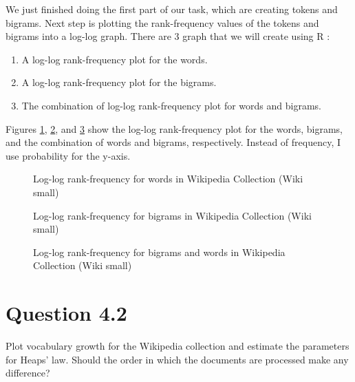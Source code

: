 \documentclass[letterpaper,11pt]{article}
\begin{document}
We just finished doing the first part of our task, which are creating tokens and bigrams. Next step is plotting the rank-frequency values of the tokens and bigrams into a log-log graph. There are 3 graph that we will create using R \cite{r-project}:
\begin{enumerate}
\item A log-log rank-frequency plot for the words.
\item A log-log rank-frequency plot for the bigrams.
\item The combination of log-log rank-frequency plot for words and bigrams. 
\end{enumerate}

Figures \ref{fig:4_1_rank_freq_plot}, \ref{fig:4_1_rank_freq_bigram_plot}, and \ref{fig:4_1_log_log_plot_combination} show the log-log rank-frequency plot for the words, bigrams, and the combination of words and bigrams, respectively. Instead of frequency, I use probability for the y-axis. 

\begin{figure}[H]
	\centering
	\caption{Log-log rank-frequency for words in Wikipedia Collection (Wiki small)}
	\label{fig:4_1_rank_freq_plot}
\end{figure}

\begin{figure}[H]
	\centering
	\caption{Log-log rank-frequency for bigrams in Wikipedia Collection (Wiki small)}
	\label{fig:4_1_rank_freq_bigram_plot}
\end{figure}

\begin{figure}[H]
	\centering
	\caption{Log-log rank-frequency for bigrams and words in Wikipedia Collection (Wiki small)}
	\label{fig:4_1_log_log_plot_combination}
\end{figure}

\noindent\makebox[\linewidth]{\rule{\textwidth}{0.4pt}}

\section*{Question 4.2}
\begin{spverbatim}
Plot vocabulary growth for the Wikipedia collection and estimate the parameters for Heaps’ law. Should the order in which the documents are processed make any difference?
\end{spverbatim}
\end{document}

